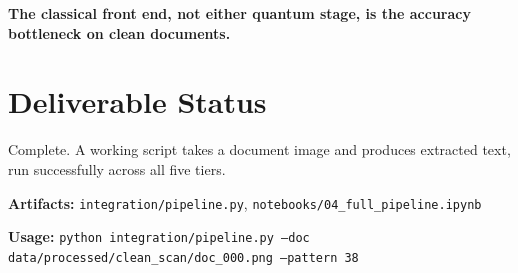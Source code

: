 \documentclass[11pt,a4paper]{article}
\begin{document}
\textbf{The classical front end, not either quantum stage, is the accuracy
bottleneck on clean documents.}

\section{Deliverable Status}

Complete. A working script takes a document image and produces extracted text,
run successfully across all five tiers.

\vspace{0.3cm}
\noindent\textbf{Artifacts:} \texttt{integration/pipeline.py},
\texttt{notebooks/04\_full\_pipeline.ipynb}

\vspace{0.2cm}
\noindent\textbf{Usage:}
\texttt{python integration/pipeline.py --doc data/processed/clean\_scan/doc\_000.png --pattern 38}
\end{document}
